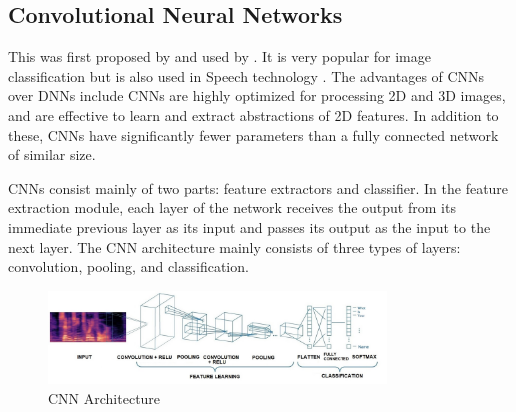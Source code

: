 \subsection{Convolutional Neural Networks}
\label{sub:CNN}
This was first proposed by \cite{fukushima_neocognitron_1988} and used by \cite{lecun_gradient-based_1998}. It is very popular for image classification but is also used in Speech technology\cite{abdel-hamid_exploring_2013} \cite{ghahremani_acoustic_2016} \cite{dua_developing_2022}. The advantages of CNNs over DNNs include CNNs are highly optimized for processing 2D and 3D images, and are effective to learn and extract abstractions of 2D features. In addition to these, CNNs have significantly fewer parameters than a fully connected network of similar size.

CNNs consist mainly of two parts: feature extractors and classifier. In the feature extraction module, each layer of the network receives the output from its immediate previous layer as its input and passes its output as the input to the next layer. The CNN architecture mainly consists of three types of layers: convolution, pooling, and classification.

\begin{figure}[h!]
    \centering
    \includegraphics[width=0.8\textwidth]{img/CNN.jpg}
    \caption{CNN Architecture}
    \label{fig:cnn-arch}
\end{figure}

